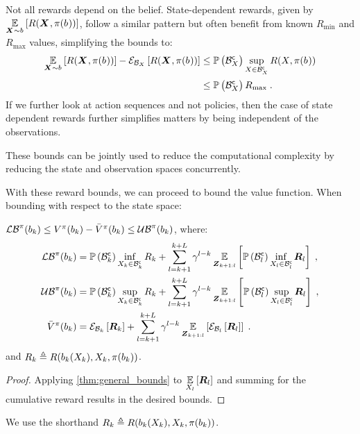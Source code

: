 Not all rewards depend on the belief. State-dependent rewards, given by $\expectation{R(\statesRV{},\pi(\blf{}))}{\statesRV{}\sim\blf{}}$, follow a similar pattern but often benefit from known $R_{\min}$ and $R_{\max}$ values, simplifying the bounds to:
\begin{equation}
	\begin{split}
		\expectation{R(\statesRV{},\pi(\blf{}))}{\statesRV{}\sim\blf{}}-\partialexpectation{R(\statesRV{},\pi(\blf{}))}{\subSpaceI{\states{}}}&\leq\measure{\stcompI{\subSpace}{\states{}}}\sup_{\states{}\in\stcompI{\subSpace}{\states{}}}R(\states{},\pi(\blf{}))             \\
		 &\leq\measure{\stcompI{\subSpace}{\states{}}}R_{\max}\;.
	\end{split}
\end{equation}
If we further look at action sequences and not policies, then the case of state dependent rewards further simplifies matters by being independent of the observations.

These bounds can be jointly used to reduce the computational complexity by reducing the state and observation spaces concurrently.

With these reward bounds, we can proceed to bound the value function. When bounding with respect to the state space:
\begin{corollary}
	\label{thm:val_func_bounds_states}
	$\lowerbound^\pi(\blf{k})\leq V^\pi(\blf{k})-\bar{V}^\pi(\blf{k})\leq\upperbound^\pi(\blf{k})$, where:
	\begin{subequations}
		\begin{align}
			\lowerbound\nolimits^\pi(\blf{k})& =\measure{\stcompI{\subSpace}{k}}\inf_{\states{k}\in\stcompI{\subSpace}{k}}R_k+\sum_{l=k+1}^{k+L}\gamma^{l-k}\expectation{\measure{\stcompI{\subSpace}{l}}\inf_{\states{l}\in\stcompI{\subSpace}{l}}\boldsymbol{R}_l}{\observationsRV{k+1:l}}\;,\\
			\upperbound\nolimits^\pi(\blf{k}) & =\measure{\stcompI{\subSpace}{k}}\sup_{\states{k}\in\stcompI{\subSpace}{k}}R_k+\sum_{l=k+1}^{k+L}\gamma^{l-k}\expectation{\measure{\stcompI{\subSpace}{l}}\sup_{\states{l}\in\stcompI{\subSpace}{l}}\boldsymbol{R}_l}{\observationsRV{k+1:l}}\;,\\
			\bar{V}^\pi(\blf{k}) & =\partialexpectation{\boldsymbol{R}_k}{\subSpaceI{k}}+\sum_{l=k+1}^{k+L}\gamma^{l-k}\expectation{\partialexpectation{\boldsymbol{R}_l}{\subSpaceI{l}}}{\observationsRV{k+1:l}}\;.
		\end{align}
	\end{subequations}
	and $R_k\triangleq R(\blf{k}(\states{k}),\states{k},\pi(\blf{k}))$.
\end{corollary}
\begin{proof}
	Applying \cref{thm:general_bounds} to $\expectation{\boldsymbol{R}_l}{\states{l}}$ and summing for the cumulative reward results in the desired bounds.
\end{proof}
\noindent We use the shorthand $R_k\triangleq R(\blf{k}(\states{k}),\states{k},\pi(\blf{k}))$.

